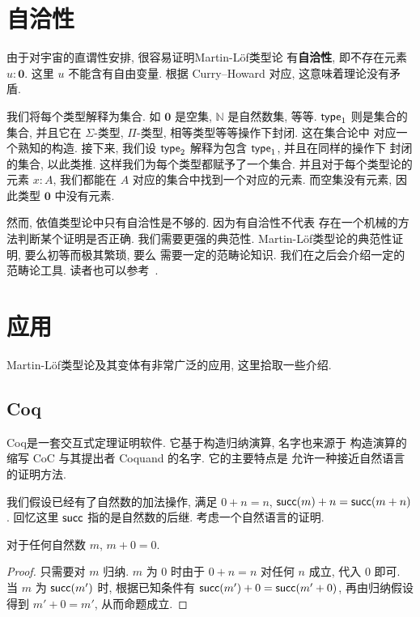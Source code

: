 \section{自洽性}

由于对宇宙的直谓性安排, 很容易证明Martin-L\"of类型论
有\textbf{自洽性}, 即不存在元素 \(u : \mathbf 0\).
这里 \(u\) 不能含有自由变量. 根据 Curry--Howard 对应,
这意味着理论没有矛盾.

我们将每个类型解释为集合. 如 \(\mathbf 0\) 是空集,
\(\mathbb{N}\) 是自然数集, 等等. \(\textsf{type}_1\)
则是集合的集合, 并且它在 \(\Sigma\)-类型,
\(\Pi\)-类型, 相等类型等等操作下封闭. 这在集合论中
对应一个熟知的构造. 接下来, 我们设 \(\textsf{type}_2\)
解释为包含 \(\textsf{type}_1\), 并且在同样的操作下
封闭的集合, 以此类推. 这样我们为每个类型都赋予了一个集合.
并且对于每个类型论的元素 \(x : A\), 我们都能在 \(A\)
对应的集合中找到一个对应的元素. 而空集没有元素, 因此类型
\(\mathbf 0\) 中没有元素.

然而, 依值类型论中只有自洽性是不够的. 因为有自洽性不代表
存在一个机械的方法判断某个证明是否正确. 我们需要更强的典范性.
Martin-L\"of类型论的典范性证明, 要么初等而极其繁琐, 要么
需要一定的范畴论知识. 我们在之后会介绍一定的范畴论工具.
读者也可以参考~\cite[\S5.6]{sterling:2021:thesis}.

\section{应用}

Martin-L\"of类型论及其变体有非常广泛的应用, 这里拾取一些介绍.

\subsection{Coq}

Coq是一套交互式定理证明软件. 它基于构造归纳演算, 名字也来源于
构造演算的缩写 CoC 与其提出者 Coquand 的名字. 它的主要特点是
允许一种接近自然语言的证明方法.

我们假设已经有了自然数的加法操作, 满足 \(0 + n = n\),
\(\textsf{succ}(m) + n = \textsf{succ}(m+n)\). 回忆这里
\(\textsf{succ}\) 指的是自然数的后继. 考虑一个自然语言的证明.
\begin{theorem}
对于任何自然数 \(m\), \(m+0 = 0\).
\end{theorem}
\begin{proof}
只需要对 \(m\) 归纳. \(m\) 为 \(0\) 时由于 \(0 + n = n\)
对任何 \(n\) 成立, 代入 \(0\) 即可. 当 \(m\) 为
\(\textsf{succ}(m')\) 时, 根据已知条件有
\(\textsf{succ}(m') + 0 = \textsf{succ}(m'+0)\),
再由归纳假设得到 \(m' + 0 = m'\), 从而命题成立.
\end{proof}

